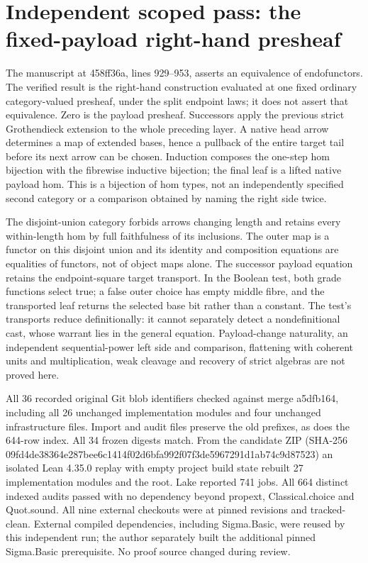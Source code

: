 \documentclass{article}
\begin{document}
\section*{Independent scoped pass: the fixed-payload right-hand presheaf}
The manuscript at 458ff36a, lines 929--953, asserts an equivalence of endofunctors. The verified result is the right-hand construction evaluated at one fixed ordinary category-valued presheaf, under the split endpoint laws; it does not assert that equivalence. Zero is the payload presheaf. Successors apply the previous strict Grothendieck extension to the whole preceding layer. A native head arrow determines a map of extended bases, hence a pullback of the entire target tail before its next arrow can be chosen. Induction composes the one-step hom bijection with the fibrewise inductive bijection; the final leaf is a lifted native payload hom. This is a bijection of hom types, not an independently specified second category or a comparison obtained by naming the right side twice.
\par The disjoint-union category forbids arrows changing length and retains every within-length hom by full faithfulness of its inclusions. The outer map is a functor on this disjoint union and its identity and composition equations are equalities of functors, not of object maps alone. The successor payload equation retains the endpoint-square target transport. In the Boolean test, both grade functions select true; a false outer choice has empty middle fibre, and the transported leaf returns the selected base bit rather than a constant. The test's transports reduce definitionally: it cannot separately detect a nondefinitional cast, whose warrant lies in the general equation. Payload-change naturality, an independent sequential-power left side and comparison, flattening with coherent units and multiplication, weak cleavage and recovery of strict algebras are not proved here.
\par All 36 recorded original Git blob identifiers checked against merge a5dfb164, including all 26 unchanged implementation modules and four unchanged infrastructure files. Import and audit files preserve the old prefixes, as does the 644-row index. All 34 frozen digests match. From the candidate ZIP (SHA-256 09fd4de38364e287bee6c1414f02d6bfa992f07f3de5967291d1ab74c9d87523) an isolated Lean 4.35.0 replay with empty project build state rebuilt 27 implementation modules and the root. Lake reported 741 jobs. All 664 distinct indexed audits passed with no dependency beyond propext, Classical.choice and Quot.sound. All nine external checkouts were at pinned revisions and tracked-clean. External compiled dependencies, including Sigma.Basic, were reused by this independent run; the author separately built the additional pinned Sigma.Basic prerequisite. No proof source changed during review.
\end{document}
